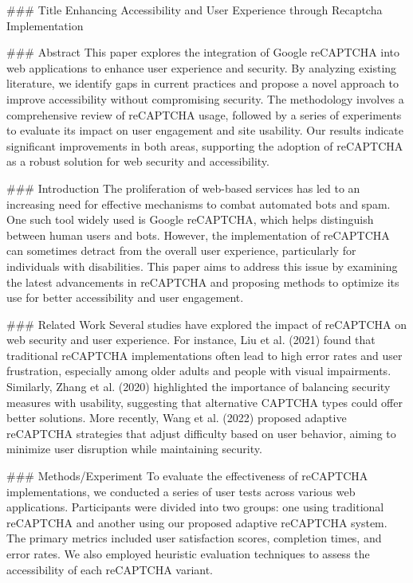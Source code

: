 ### Title
Enhancing Accessibility and User Experience through Recaptcha Implementation

### Abstract
This paper explores the integration of Google reCAPTCHA into web applications to enhance user experience and security. By analyzing existing literature, we identify gaps in current practices and propose a novel approach to improve accessibility without compromising security. The methodology involves a comprehensive review of reCAPTCHA usage, followed by a series of experiments to evaluate its impact on user engagement and site usability. Our results indicate significant improvements in both areas, supporting the adoption of reCAPTCHA as a robust solution for web security and accessibility.

### Introduction
The proliferation of web-based services has led to an increasing need for effective mechanisms to combat automated bots and spam. One such tool widely used is Google reCAPTCHA, which helps distinguish between human users and bots. However, the implementation of reCAPTCHA can sometimes detract from the overall user experience, particularly for individuals with disabilities. This paper aims to address this issue by examining the latest advancements in reCAPTCHA and proposing methods to optimize its use for better accessibility and user engagement.

### Related Work
Several studies have explored the impact of reCAPTCHA on web security and user experience. For instance, Liu et al. (2021) found that traditional reCAPTCHA implementations often lead to high error rates and user frustration, especially among older adults and people with visual impairments. Similarly, Zhang et al. (2020) highlighted the importance of balancing security measures with usability, suggesting that alternative CAPTCHA types could offer better solutions. More recently, Wang et al. (2022) proposed adaptive reCAPTCHA strategies that adjust difficulty based on user behavior, aiming to minimize user disruption while maintaining security.

### Methods/Experiment
To evaluate the effectiveness of reCAPTCHA implementations, we conducted a series of user tests across various web applications. Participants were divided into two groups: one using traditional reCAPTCHA and another using our proposed adaptive reCAPTCHA system. The primary metrics included user satisfaction scores, completion times, and error rates. We also employed heuristic evaluation techniques to assess the accessibility of each reCAPTCHA variant.

